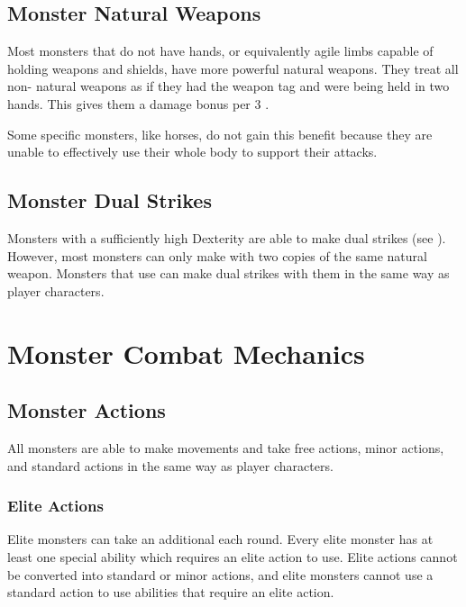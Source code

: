   \subsection{Monster Natural Weapons}\label{Monster Natural Weapon}
    Most monsters that do not have hands, or equivalently agile limbs capable of holding weapons and shields, have more powerful natural weapons.
    They treat all non- natural weapons as if they had the  weapon tag and were being held in two hands.
    This gives them a  damage bonus per 3 .

    Some specific monsters, like horses, do not gain this benefit because they are unable to effectively use their whole body to support their attacks.

  \subsection{Monster Dual Strikes}\label{Monster Dual Strikes}
    Monsters with a sufficiently high Dexterity are able to make dual strikes (see ).
    However, most monsters can only make  with two copies of the same  natural weapon.
    Monsters that use  can make dual strikes with them in the same way as player characters.

\section{Monster Combat Mechanics}

  \subsection{Monster Actions}\label{Monster Actions}
    All monsters are able to make movements and take free actions, minor actions, and standard actions in the same way as player characters.

    \subsubsection{Elite Actions}\label{Elite Actions}
      Elite monsters can take an additional  each round.
      Every elite monster has at least one special ability which requires an elite action to use.
      Elite actions cannot be converted into standard or minor actions, and elite monsters cannot use a standard action to use abilities that require an elite action.

